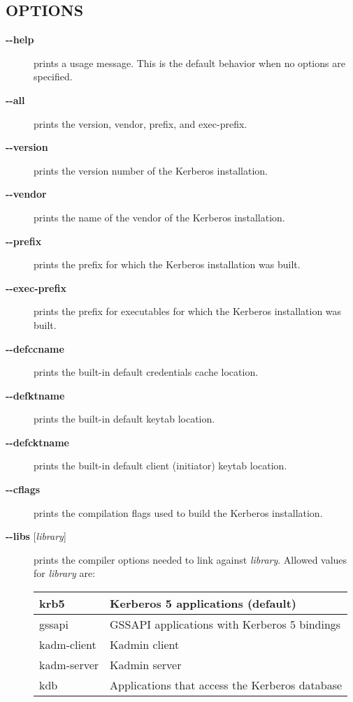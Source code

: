 \documentclass[letterpaper,10pt,english]{sphinxmanual}
\begin{document}
\subsection{OPTIONS}
\label{user/user_commands/krb5-config:options}\begin{description}
\item[{\textbf{-}\textbf{-help}}] \leavevmode
prints a usage message.  This is the default behavior when no options
are specified.

\item[{\textbf{-}\textbf{-all}}] \leavevmode
prints the version, vendor, prefix, and exec-prefix.

\item[{\textbf{-}\textbf{-version}}] \leavevmode
prints the version number of the Kerberos installation.

\item[{\textbf{-}\textbf{-vendor}}] \leavevmode
prints the name of the vendor of the Kerberos installation.

\item[{\textbf{-}\textbf{-prefix}}] \leavevmode
prints the prefix for which the Kerberos installation was built.

\item[{\textbf{-}\textbf{-exec-prefix}}] \leavevmode
prints the prefix for executables for which the Kerberos installation
was built.

\item[{\textbf{-}\textbf{-defccname}}] \leavevmode
prints the built-in default credentials cache location.

\item[{\textbf{-}\textbf{-defktname}}] \leavevmode
prints the built-in default keytab location.

\item[{\textbf{-}\textbf{-defcktname}}] \leavevmode
prints the built-in default client (initiator) keytab location.

\item[{\textbf{-}\textbf{-cflags}}] \leavevmode
prints the compilation flags used to build the Kerberos installation.

\item[{\textbf{-}\textbf{-libs} {[}\emph{library}{]}}] \leavevmode
prints the compiler options needed to link against \emph{library}.
Allowed values for \emph{library} are:

\begin{tabulary}{\linewidth}{|L|L|}
\hline

krb5
 & 
Kerberos 5 applications (default)
\\
\hline
gssapi
 & 
GSSAPI applications with Kerberos 5 bindings
\\
\hline
kadm-client
 & 
Kadmin client
\\
\hline
kadm-server
 & 
Kadmin server
\\
\hline
kdb
 & 
Applications that access the Kerberos database
\\
\hline\end{tabulary}


\end{description}
\end{document}
